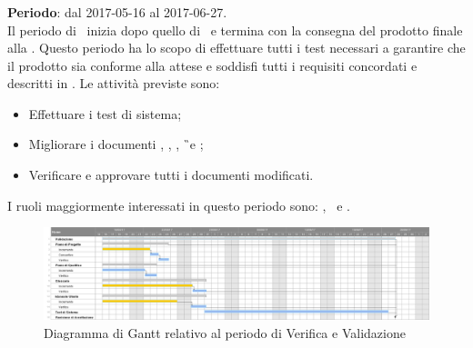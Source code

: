 		\subsubsection{\VV}
		\textbf{Periodo}: dal 2017-05-16 al 2017-06-27.\\
		Il periodo di \VV\ inizia dopo quello di \CO\ e termina con la consegna del prodotto finale alla \RA. Questo periodo ha lo scopo di effettuare tutti i test necessari a garantire che il prodotto sia conforme alla attese e soddisfi tutti i requisiti concordati e descritti in \AdR. Le attività previste sono:
		\begin{itemize}
			\item Effettuare i test di sistema;
			\item Migliorare i documenti \NdP, \PdP, \PdQ, \G\ e \MU;
			\item Verificare e approvare tutti i documenti modificati.
		\end{itemize}
			I ruoli maggiormente interessati in questo periodo sono: \textit{\Res}, \textit{\Prog}\ e \textit{\Ver}.
			
		\begin{figure}[H]
			\centering
			\includegraphics[scale=0.26]{img/ganttnetbreak6.png}
			\caption{Diagramma di Gantt relativo al periodo di Verifica e Validazione}
		\end{figure}
